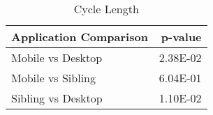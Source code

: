 \begin{table}[ht]
\centering
\caption{Cycle Length} 
\begin{tabular}{lr}
  \hline
Application Comparison & p-value \\ 
  \hline
Mobile vs Desktop & 2.38E-02 \\ 
  Mobile vs Sibling & 6.04E-01 \\ 
  Sibling vs Desktop & 1.10E-02 \\ 
   \hline
\end{tabular}
\end{table}
